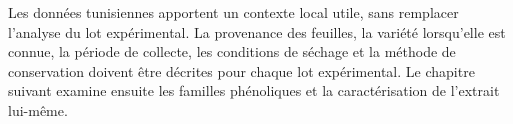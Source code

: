 Les données tunisiennes apportent un contexte local utile, sans remplacer l'analyse du lot expérimental. La provenance des feuilles, la variété lorsqu'elle est connue, la période de collecte, les conditions de séchage et la méthode de conservation doivent être décrites pour chaque lot expérimental. Le chapitre suivant examine ensuite les familles phénoliques et la caractérisation de l'extrait lui-même.
